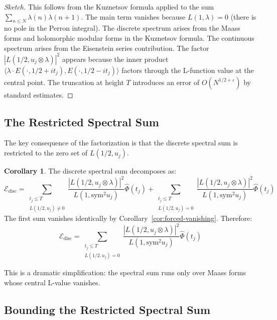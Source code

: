 \documentclass[11pt,a4paper]{article}
\theoremstyle{definition}
\newtheorem{corollary}[theorem]{Corollary}
\newcommand{\Sym}{\mathrm{sym}}
\newcommand{\disc}{\mathrm{disc}}
\begin{document}
\begin{proof}[Sketch]
This follows from the Kuznetsov formula applied to the sum $\sum_{n \le N} \lambda(n)\lambda(n+1)$. The main term vanishes because $L(1,\lambda) = 0$ (there is no pole in the Perron integral). The discrete spectrum arises from the Maass forms and holomorphic modular forms in the Kuznetsov formula. The continuous spectrum arises from the Eisenstein series contribution. The factor $|L(1/2, u_j \otimes \lambda)|^2$ appears because the inner product $\langle \lambda \cdot E(\cdot, 1/2+it_j), E(\cdot, 1/2-it_j) \rangle$ factors through the L-function value at the central point. The truncation at height $T$ introduces an error of $O(N^{1/2+\varepsilon})$ by standard estimates.
\end{proof}

\subsection{The Restricted Spectral Sum}

The key consequence of the factorization is that the discrete spectral sum is restricted to the zero set of $L(1/2, u_j)$.

\begin{corollary}
\label{cor:restricted-sum}
The discrete spectral sum decomposes as:
\begin{equation}
\mathcal{E}_{\disc} = \sum_{\substack{t_j \le T \\ L(1/2, u_j) \neq 0}} \frac{|L(1/2, u_j \otimes \lambda)|^2}{L(1, \Sym^2 u_j)} \hat{\Phi}(t_j) + \sum_{\substack{t_j \le T \\ L(1/2, u_j) = 0}} \frac{|L(1/2, u_j \otimes \lambda)|^2}{L(1, \Sym^2 u_j)} \hat{\Phi}(t_j)
\end{equation}
The first sum vanishes identically by Corollary~\ref{cor:forced-vanishing}. Therefore:
\begin{equation}
\mathcal{E}_{\disc} = \sum_{\substack{t_j \le T \\ L(1/2, u_j) = 0}} \frac{|L(1/2, u_j \otimes \lambda)|^2}{L(1, \Sym^2 u_j)} \hat{\Phi}(t_j)
\end{equation}
\end{corollary}

This is a dramatic simplification: the spectral sum runs only over Maass forms whose central L-value vanishes.

\subsection{Bounding the Restricted Spectral Sum}
\end{document}

